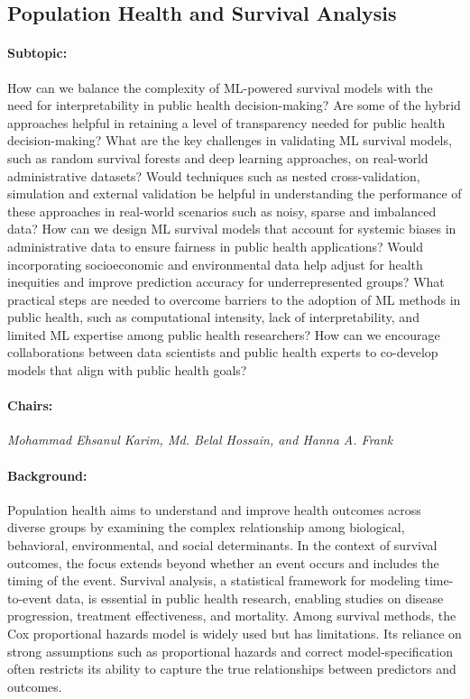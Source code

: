 \subsection{Population Health and Survival Analysis}

\paragraph{Subtopic:} 
How can we balance the complexity of ML-powered survival models with the need for interpretability in public health decision-making? Are some of the hybrid approaches helpful in retaining a level of transparency needed for public health decision-making?  What are the key challenges in validating ML survival models, such as random survival forests and deep learning approaches, on real-world administrative datasets? Would techniques such as nested cross-validation, simulation and external validation be helpful in understanding the performance of these approaches in real-world scenarios such as noisy, sparse and imbalanced data?  How can we design ML survival models that account for systemic biases in administrative data to ensure fairness in public health applications? Would incorporating socioeconomic and environmental data help adjust for health inequities and improve prediction accuracy for underrepresented groups? What practical steps are needed to overcome barriers to the adoption of ML methods in public health, such as computational intensity, lack of interpretability, and limited ML expertise among public health researchers? How can we encourage collaborations between data scientists and public health experts to co-develop models that align with public health goals?

\paragraph{Chairs: }
\textit{Mohammad Ehsanul Karim, Md. Belal Hossain, and Hanna A. Frank}

\paragraph{Background:}

Population health aims to understand and improve health outcomes across diverse groups by examining the complex relationship among biological, behavioral, environmental, and social determinants. In the context of survival outcomes, the focus extends beyond whether an event occurs and includes the timing of the event. Survival analysis, a statistical framework for modeling time-to-event data, is essential in public health research, enabling studies on disease progression, treatment effectiveness, and mortality. Among survival methods, the Cox proportional hazards model is widely used but has limitations. Its reliance on strong assumptions such as proportional hazards and correct model-specification often restricts its ability to capture the true relationships between predictors and outcomes.

